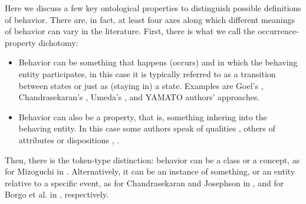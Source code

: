 \documentclass[sw]{iosart2x}
\newcommand{\YAMATO}{\textsc{YAMATO}\xspace}
\newcommand{\stateVarCond}[1]{%
  \ifthenelse{\equal{#1}{fullSingular}}{system condition}{%
    \ifthenelse{\equal{#1}{shortSingular}}{condition}{%
      \ifthenelse{\equal{#1}{fullPlural}}{system conditions}{%
        \ifthenelse{\equal{#1}{shortPlural}}{conditions}{%
          ERROR!%
        }%
      }%
    }%
  }%
}
\newcommand{\TODO}[1]{{\color{red} #1
}}
\begin{document}

Here we discuss a few key ontological properties to distinguish possible definitions of behavior.
There are, in fact, at least four %
axes along which different meanings of behavior can vary in the literature.
First, there is what we call the occurrence-property dichotomy:
\begin{itemize}
  \item Behavior can be something that happens (occurs) and in which the behaving entity participates, 
  in this case it is typically referred to as a transition between states or just as (staying in) a state. 
  Examples are Goel's \cite{goelStructureBehaviorFunction2009}, Chandrasekaran's \cite{chandrasekaranFunctionDeviceRepresentation2000}, Umeda's \cite{umedaFunctionBehaviourStructure1990}, and \YAMATO authors' \cite{mizoguchiFunctionalOntologyArtifacts2009} approaches.
  \item Behavior can also be a property, that is, something inhering into the behaving entity. 
  In this case some authors speak of qualities \cite{borgoFormalOntologicalPerspective2009}, others of attributes or dispositions \cite{vermaasConceptualFrameworkJohn2007}, \cite{geroCategorisingTechnologicalKnowledge2002}.
\end{itemize} 

Then, there is the token-type distinction: behavior can be a class or a concept, as for  Mizoguchi in \cite{mizoguchiFunctionalOntologyArtifacts2009}. Alternatively, it can be an instance of something, or an entity relative to a specific event, as for Chandrasekaran and Josephson in \cite{chandrasekaranFunctionDeviceRepresentation2000}, and for Borgo et al. in \cite{borgoFormalOntologicalPerspective2009}, respectively. 
\end{document}
